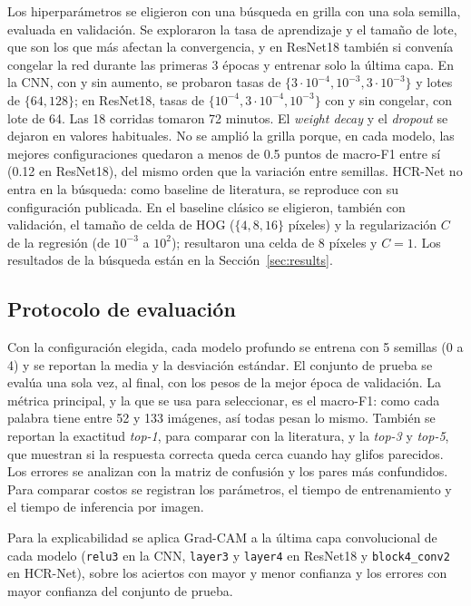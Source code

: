\documentclass[conference]{IEEEtran}
\begin{document}
Los hiperparámetros se eligieron con una búsqueda en grilla con una sola
semilla, evaluada en validación. Se exploraron la tasa de aprendizaje y el
tamaño de lote, que son los que más afectan la convergencia, y en ResNet18
también si convenía congelar la red durante las primeras 3 épocas y entrenar
solo la última capa. En la CNN, con y sin aumento, se probaron tasas de
$\{3\cdot10^{-4}, 10^{-3}, 3\cdot10^{-3}\}$ y lotes de $\{64, 128\}$; en
ResNet18, tasas de $\{10^{-4}, 3\cdot10^{-4}, 10^{-3}\}$ con y sin congelar,
con lote de 64. Las 18 corridas tomaron 72 minutos. El \textit{weight decay}
y el \textit{dropout} se dejaron en valores habituales. No se amplió la grilla
porque, en cada modelo, las mejores configuraciones quedaron a menos de 0.5
puntos de macro-F1 entre sí (0.12 en ResNet18), del mismo orden que la
variación entre semillas. HCR-Net no entra en la búsqueda: como baseline de
literatura, se reproduce con su configuración publicada. En el baseline
clásico se eligieron, también con validación, el tamaño de celda de HOG
($\{4, 8, 16\}$ píxeles) y la regularización $C$ de la regresión (de
$10^{-3}$ a $10^{2}$); resultaron una celda de 8 píxeles y $C=1$. Los
resultados de la búsqueda están en la Sección~\ref{sec:results}.

\subsection{Protocolo de evaluación}
Con la configuración elegida, cada modelo profundo se entrena con 5 semillas
(0 a 4) y se reportan la media y la desviación estándar. El conjunto de prueba
se evalúa una sola vez, al final, con los pesos de la mejor época de
validación. La métrica principal, y la que se usa para seleccionar, es el
macro-F1: como cada palabra tiene entre 52 y 133 imágenes, así todas pesan lo
mismo. También se reportan la exactitud \textit{top-1}, para comparar con la
literatura, y la \textit{top-3} y \textit{top-5}, que muestran si la respuesta
correcta queda cerca cuando hay glifos parecidos. Los errores se analizan con
la matriz de confusión y los pares más confundidos. Para comparar costos se
registran los parámetros, el tiempo de entrenamiento y el tiempo de
inferencia por imagen.

Para la explicabilidad se aplica Grad-CAM \cite{selvaraju_gradcam_2017} a la
última capa convolucional de cada modelo (\texttt{relu3} en la CNN,
\texttt{layer3} y \texttt{layer4} en ResNet18 y \texttt{block4\_conv2} en
HCR-Net), sobre los aciertos con mayor y menor confianza y los errores con
mayor confianza del conjunto de prueba.
\end{document}
